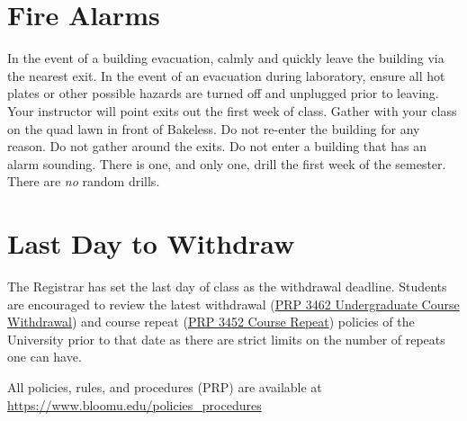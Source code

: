 \documentclass[11pt,letterpaper]{article}
\begin{document}
\section{Fire Alarms}
In the event of a building evacuation, calmly and quickly leave the building via
the nearest exit. In the event of an evacuation during laboratory, ensure all
hot plates or other possible hazards are turned off and unplugged prior to
leaving. Your instructor will point exits out the first week of class.  Gather
with your class on the quad lawn in front of Bakeless.  Do not re-enter the
building for any reason. Do not gather around the exits. Do not enter a
building that has an alarm sounding. There is one, and only one, drill the first
week of the semester. There are \emph{no} random drills.

%

\section{Last Day to Withdraw}
The Registrar has set the last day of class as the withdrawal deadline.
Students are encouraged to review the latest withdrawal
(\href{https://intranet.bloomu.edu/policies_procedures/3462}{PRP 3462 Undergraduate
Course Withdrawal}) and course repeat
(\href{https://intranet.bloomu.edu/policies_procedures/3452}{PRP 3452 Course
Repeat}) policies of the
University prior to that date as there are strict limits on the number of
repeats one can have. 

\begin{mdframed}
	\centering
	All policies, rules, and procedures (PRP) are available at
	\url{https://www.bloomu.edu/policies_procedures}
\end{mdframed}
\end{document}
